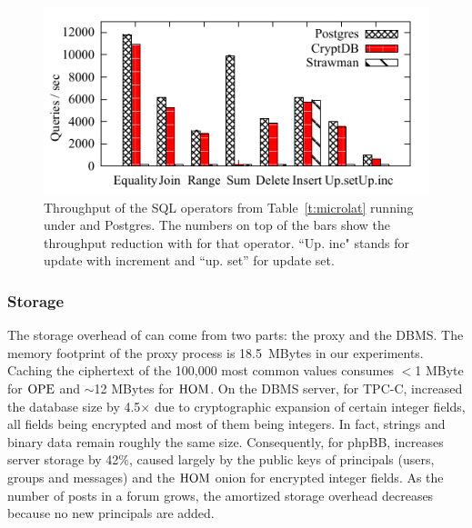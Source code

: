 \begin{figure}[t!] 
\centering
\includegraphics{fig/microbars.pdf} 
\caption{Throughput of the SQL operators from Table~\ref{t:microlat}
  running under \name and Postgres. The numbers on top of the bars
  show the throughput reduction with \name{} for that operator. ``Up. inc" stands for update with increment and ``up. set'' for update set.}
\label{fig:microtput}
\end{figure}


\subsubsection{Storage}

The storage overhead of \name can come from two parts: the proxy
and the DBMS\@.
The memory footprint of the \name{} proxy process is
18.5~MBytes in our experiments.
Caching the ciphertext of the 100,000 most common values consumes
$<$1 MByte for $\textrm{OPE}$ and $\sim$12 MBytes for $\textrm{HOM}$.  On the DBMS
server, for TPC-C, \name{} increased the database size by 4.5$\times$
due to cryptographic expansion of certain integer fields, all fields being encrypted and most of them being integers. In fact, strings and
binary data remain roughly the same size. Consequently,
for phpBB, \name{} increases server storage by 42\%, caused largely
by the public keys of principals (users, groups and messages) and the
$\textrm{HOM}$ onion for encrypted integer fields.
As the number of posts in a forum grows, the amortized storage overhead
decreases because no new principals are added.


